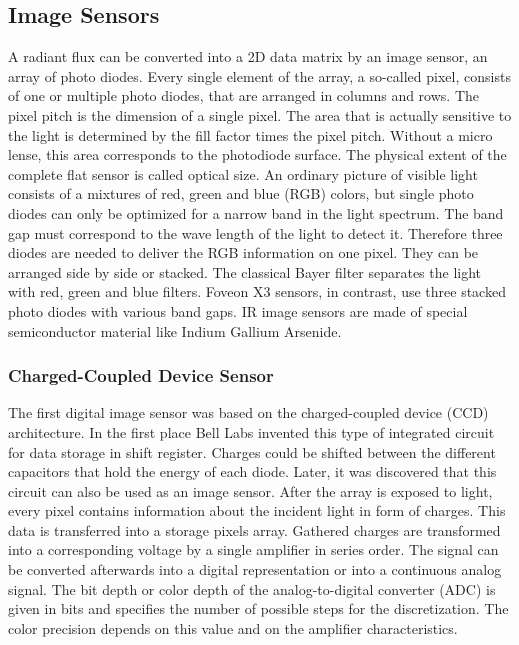 \subsection{Image Sensors}
A radiant flux can be converted into a 2D data matrix by an image sensor, an array of photo diodes. Every single element of the array, a so-called pixel, consists of one or multiple photo diodes, that are arranged in columns and rows. The pixel pitch is the dimension of a single pixel. The area that is actually sensitive to the light is determined by the fill factor times the pixel pitch. Without a micro lense, this area corresponds to the photodiode surface. The physical extent of the complete flat sensor is called optical size. An ordinary picture of visible light consists of a mixtures of red, green and blue (RGB) colors, but single photo diodes can only be optimized for a narrow band in the light spectrum. The band gap must correspond to the wave length of the light to detect it. Therefore three diodes are needed to deliver the RGB information on one pixel. They can be arranged side by side or stacked. The classical Bayer filter separates the light with red, green and blue filters. Foveon X3 sensors, in contrast, use three stacked photo diodes with various band gaps. IR image sensors are made of special semiconductor material like Indium Gallium Arsenide. 

\subsubsection{Charged-Coupled Device Sensor}

The first digital image sensor was based on the charged-coupled device (CCD) architecture. In the first place Bell Labs invented this type of integrated circuit for data storage in shift register. Charges could be shifted between the different capacitors that hold the energy of each diode. Later, it was discovered that this circuit can also be used as an image sensor. After the array is exposed to light, every pixel contains information about the incident light in form of charges. This data is transferred into a storage pixels array. Gathered charges are transformed into a corresponding voltage by a single amplifier in series order. The signal can be converted afterwards into a digital representation or into a continuous analog signal. The bit depth or color depth of the analog-to-digital converter (ADC) is given in bits and specifies the number of possible steps for the discretization. The color precision depends on this value and on the amplifier characteristics.


